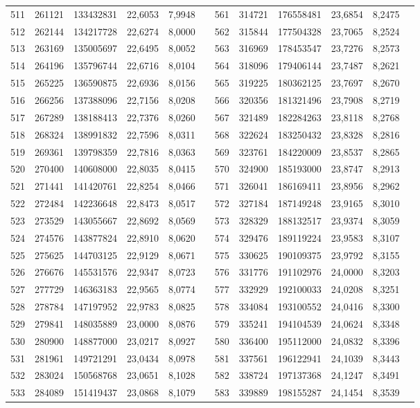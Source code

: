 \begin{longtable}{p{.17\linewidth}*{11}{S}}
511&261121&133432831&22,6053&7,9948&&561&314721&176558481&23,6854&8,2475\\
512&262144&134217728&22,6274&8,0000&&562&315844&177504328&23,7065&8,2524\\
513&263169&135005697&22,6495&8,0052&&563&316969&178453547&23,7276&8,2573\\
514&264196&135796744&22,6716&8,0104&&564&318096&179406144&23,7487&8,2621\\
515&265225&136590875&22,6936&8,0156&&565&319225&180362125&23,7697&8,2670\\
516&266256&137388096&22,7156&8,0208&&566&320356&181321496&23,7908&8,2719\\
517&267289&138188413&22,7376&8,0260&&567&321489&182284263&23,8118&8,2768\\
518&268324&138991832&22,7596&8,0311&&568&322624&183250432&23,8328&8,2816\\
519&269361&139798359&22,7816&8,0363&&569&323761&184220009&23,8537&8,2865\\
520&270400&140608000&22,8035&8,0415&&570&324900&185193000&23,8747&8,2913\\
521&271441&141420761&22,8254&8,0466&&571&326041&186169411&23,8956&8,2962\\
522&272484&142236648&22,8473&8,0517&&572&327184&187149248&23,9165&8,3010\\
523&273529&143055667&22,8692&8,0569&&573&328329&188132517&23,9374&8,3059\\
524&274576&143877824&22,8910&8,0620&&574&329476&189119224&23,9583&8,3107\\
525&275625&144703125&22,9129&8,0671&&575&330625&190109375&23,9792&8,3155\\
526&276676&145531576&22,9347&8,0723&&576&331776&191102976&24,0000&8,3203\\
527&277729&146363183&22,9565&8,0774&&577&332929&192100033&24,0208&8,3251\\
528&278784&147197952&22,9783&8,0825&&578&334084&193100552&24,0416&8,3300\\
529&279841&148035889&23,0000&8,0876&&579&335241&194104539&24,0624&8,3348\\
530&280900&148877000&23,0217&8,0927&&580&336400&195112000&24,0832&8,3396\\
531&281961&149721291&23,0434&8,0978&&581&337561&196122941&24,1039&8,3443\\
532&283024&150568768&23,0651&8,1028&&582&338724&197137368&24,1247&8,3491\\
533&284089&151419437&23,0868&8,1079&&583&339889&198155287&24,1454&8,3539\\

\end{longtable}
